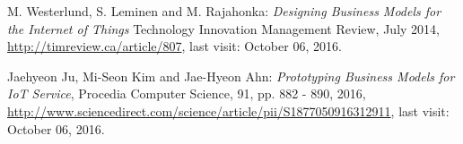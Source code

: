 \begin{thebibliography}{99}
 		 M. Westerlund, S. Leminen and M. Rajahonka: \emph{Designing Business Models for the Internet of Things} Technology Innovation Management Review, July 2014, \url{http://timreview.ca/article/807}, last visit: October 06, 2016.

 		 Jaehyeon Ju, Mi-Seon Kim and Jae-Hyeon Ahn: \emph{Prototyping Business Models for IoT Service}, Procedia Computer Science, 91, pp. 882 - 890, 2016, \url{http://www.sciencedirect.com/science/article/pii/S1877050916312911}, last visit: October 06, 2016.
	 \end{thebibliography}








